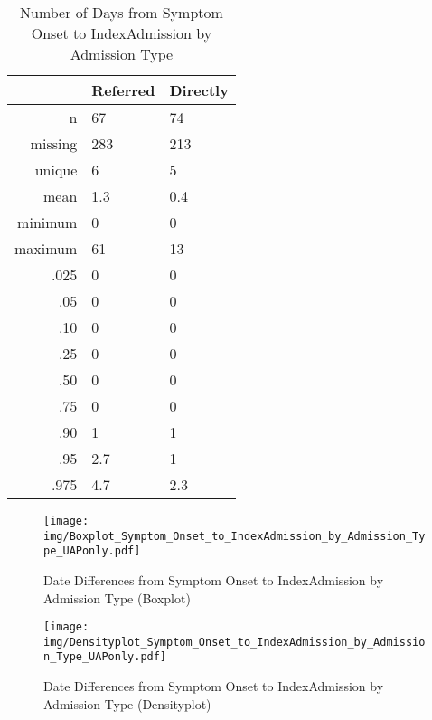 \documentclass[a4paper]{report}
\begin{document}
\begin{itemize}
{%
\begin{table}[ht]
\centering
\begin{tabular}{rll}
  \toprule
 & Referred & Directly \\ 
  \midrule
n & 67 & 74 \\ 
  missing & 283 & 213 \\ 
  unique & 6 & 5 \\ 
  mean & 1.3 & 0.4 \\ 
  minimum & 0 & 0 \\ 
  maximum & 61 & 13 \\ 
  .025 & 0 & 0 \\ 
  .05 & 0 & 0 \\ 
  .10 & 0 & 0 \\ 
  .25 & 0 & 0 \\ 
  .50 & 0 & 0 \\ 
  .75 & 0 & 0 \\ 
  .90 & 1 & 1 \\ 
  .95 & 2.7 & 1 \\ 
  .975 & 4.7 & 2.3 \\ 
   \bottomrule
\end{tabular}
\caption{Number of Days from Symptom Onset to IndexAdmission by Admission Type} 
\end{table}
\begin{figure}
  \centering
  \caption{Date Differences from Symptom Onset to IndexAdmission by Admission Type (Boxplot)}
  \label{Boxplot: Date Differences from Symptom Onset to IndexAdmission by Admission Type}
\texttt{[image: img/Boxplot\_Symptom\_Onset\_to\_IndexAdmission\_by\_Admission\_Type\_UAPonly.pdf]}\end{figure}


\begin{figure}
  \centering
  \caption{Date Differences from Symptom Onset to IndexAdmission by Admission Type (Densityplot)}
  \label{Density: Date Differences from Symptom Onset to IndexAdmission by Admission Type}
\texttt{[image: img/Densityplot\_Symptom\_Onset\_to\_IndexAdmission\_by\_Admission\_Type\_UAPonly.pdf]}\end{figure}


\clearpage

}
\end{itemize}
\end{document}
